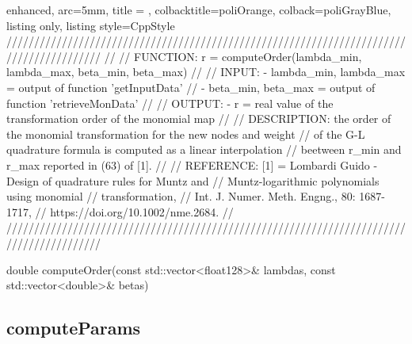 \documentclass[a4paper, twosided]{book}
\begin{document}
\begin{tcblisting}{enhanced,
                   arc=5mm,
                   title = \color{black}{\large \ttfamily MonMap.cpp/computeOrder},
                   colbacktitle=poliOrange,
                   colback=poliGrayBlue,
                   listing only,
                   listing style=CppStyle}
/////////////////////////////////////////////////////////////////////////////////////////
//
//       FUNCTION: r = computeOrder({lambda_min, lambda_max}, {beta_min, beta_max})
//                
//          INPUT: - {lambda_min, lambda_max} = output of function 'getInputData'
//                 - {beta_min, beta_max} = output of function 'retrieveMonData'
//
//         OUTPUT: - r = real value of the transformation order of the monomial map
//
//    DESCRIPTION: the order of the monomial transformation for the new nodes and weight
//                 of the G-L quadrature formula is computed as a linear interpolation
//                 beetween r_min and r_max reported in (63) of [1].
//
//      REFERENCE: [1] = Lombardi Guido - Design of quadrature rules for Muntz and 
//                                        Muntz-logarithmic polynomials using monomial
//                                        transformation,
//                                        Int. J. Numer. Meth. Engng., 80: 1687-1717,
//                                        https://doi.org/10.1002/nme.2684.
//
/////////////////////////////////////////////////////////////////////////////////////////

double computeOrder(const std::vector<float128>& lambdas, const std::vector<double>& betas)
\end{tcblisting}

\subsection[computeParams]{\changefont computeParams}\label{Sec4.1.5}
\end{document}
